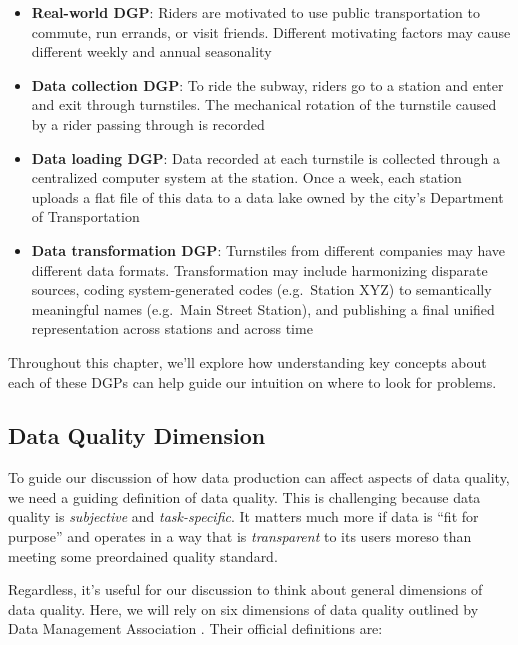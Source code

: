 \documentclass[
]{krantz}
\providecommand{\tightlist}{%
  \setlength{\itemsep}{0pt}\setlength{\parskip}{0pt}}
\begin{document}
\begin{itemize}
\tightlist
\item
  \textbf{Real-world DGP}: Riders are motivated to use public transportation to commute, run errands, or visit friends. Different motivating factors may cause different weekly and annual seasonality
\item
  \textbf{Data collection DGP}: To ride the subway, riders go to a station and enter and exit through turnstiles. The mechanical rotation of the turnstile caused by a rider passing through is recorded
\item
  \textbf{Data loading DGP}: Data recorded at each turnstile is collected through a centralized computer system at the station. Once a week, each station uploads a flat file of this data to a data lake owned by the city's Department of Transportation
\item
  \textbf{Data transformation DGP}: Turnstiles from different companies may have different data formats. Transformation may include harmonizing disparate sources, coding system-generated codes (e.g.~Station XYZ) to semantically meaningful names (e.g.~Main Street Station), and publishing a final unified representation across stations and across time
\end{itemize}

Throughout this chapter, we'll explore how understanding key concepts about each of these DGPs can help guide our intuition on where to look for problems.

\hypertarget{data-quality-dimension}{%
\subsection{Data Quality Dimension}\label{data-quality-dimension}}

To guide our discussion of how data production can affect aspects of data quality, we need a guiding definition of data quality.
This is challenging because data quality is \emph{subjective} and \emph{task-specific}.
It matters much more if data is ``fit for purpose'' and operates in a way that is \emph{transparent} to its users moreso than meeting some preordained quality standard.

Regardless, it's useful for our discussion to think about general dimensions of data quality. Here, we will rely on six dimensions of data quality outlined by Data Management Association \citep{dama}.
Their official definitions are:
\end{document}
